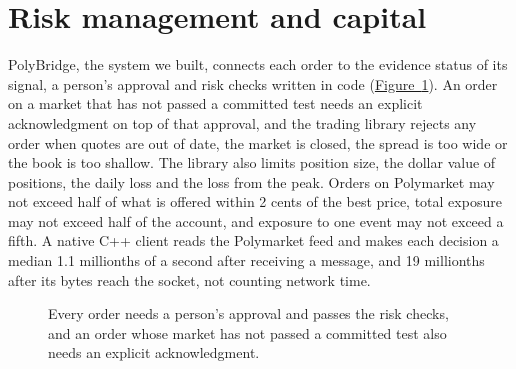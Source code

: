 \documentclass[11pt]{article}
\newcommand{\lref}[2]{\hyperref[#2]{#1~\ref*{#2}}}
\begin{document}
\section{Risk management and capital}\label{sec:risk}
PolyBridge, the system we built, connects each order to the evidence status of its signal, a person's approval and risk checks written in code (\lref{Figure}{fig:sys}). An order on a market that has not passed a committed test needs an explicit acknowledgment on top of that approval, and the trading library rejects any order when quotes are out of date, the market is closed, the spread is too wide or the book is too shallow. The library also limits position size, the dollar value of positions, the daily loss and the loss from the peak. Orders on Polymarket may not exceed half of what is offered within 2 cents of the best price, total exposure may not exceed half of the account, and exposure to one event may not exceed a fifth. A native C++ client reads the Polymarket feed and makes each decision a median 1.1 millionths of a second after receiving a message, and 19 millionths after its bytes reach the socket, not counting network time.

\begin{figure}[H]
\centering
{}
\caption{Every order needs a person's approval and passes the risk checks, and an order whose market has not passed a committed test also needs an explicit acknowledgment.}
\label{fig:sys}
\end{figure}
\end{document}
